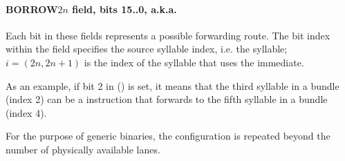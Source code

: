 \paragraph*{BORROW$2n$ field, bits 15..0, a.k.a. }
\label{reg:BORROWi}
Each bit in these fields represents a possible  forwarding route.
The bit index within the field specifies the source syllable index, i.e. the
 syllable; $i = \left ( 2n, 2n+1 \right )$ is the index of the
syllable that uses the immediate.

As an example, if bit 2 in  () is set, it means that
the third syllable in a bundle (index 2) can be a  instruction that
forwards to the fifth syllable in a bundle (index 4).

For the purpose of generic binaries, the configuration is repeated beyond the
number of physically available lanes.
